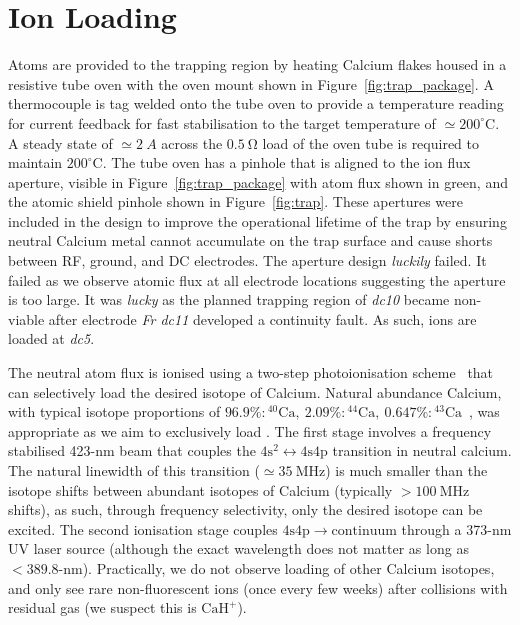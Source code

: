 \section{Ion Loading}
    Atoms are provided to the trapping region by heating Calcium flakes housed
    in a resistive tube oven with the oven mount shown in Figure~\ref{fig:trap_package}. A
    thermocouple is tag welded onto the tube oven to provide a temperature reading
    for current feedback for fast stabilisation to the target temperature of $\simeq
    200^\circ\mathrm{C}$. A steady state of $\simeq 2~\unit{A}$
    across the $0.5~\unit{\ohm}$ load of the oven tube is required to maintain $200^\circ\mathrm{C}$. The tube oven has a
    pinhole that is aligned to the ion flux aperture, visible in
    Figure~\ref{fig:trap_package} with atom flux shown in green, and the atomic shield pinhole shown in
    Figure~\ref{fig:trap}. These apertures were included in the design to
    improve the operational lifetime of the trap by ensuring neutral Calcium metal cannot
    accumulate on the trap surface and cause shorts between RF, ground, and DC
    electrodes. The aperture design \emph{luckily} failed. It failed as we
    observe atomic flux at all electrode locations suggesting the aperture is
    too large. It was \emph{lucky} as the planned trapping region of \emph{dc10} became
    non-viable after electrode \emph{Fr dc11} developed a continuity fault. As such, ions are loaded at \emph{dc5}.

    The neutral atom flux is ionised using a two-step photoionisation
    scheme~\cite{lucas_isotope-selective_2004} that can selectively load the desired isotope of Calcium.
    Natural abundance Calcium, with typical isotope proportions of
    $96.9\%:\mathrm{^{40}Ca},~2.09\%:\mathrm{^{44}Ca},~0.647\%:\mathrm{^{43}Ca}$~\cite{lucas_isotope-selective_2004}, was appropriate as we aim to exclusively load \ca.
    The first stage involves a frequency stabilised 423-nm beam
    that couples the $4\mathrm{s}^2\leftrightarrow 4\mathrm{s}4\mathrm{p}$ transition in neutral calcium. The natural linewidth of this transition ($\simeq 35~\unit{\mega\hertz}$) is much smaller than the isotope shifts between abundant isotopes of Calcium (typically $>100~\unit{\mega\hertz}$ shifts), as such, through frequency selectivity, only the desired isotope can be excited. 
    The second ionisation stage couples $4\mathrm{s}4\mathrm{p}\rightarrow \mathrm{continuum}$ through
    a 373-nm UV laser source (although the exact wavelength does not matter as
    long as $<389.8$-nm).
    Practically, we do not observe loading of other
    Calcium isotopes, and only see rare non-fluorescent ions (once every few
    weeks) after collisions with residual gas (we suspect this is
    $\mathrm{CaH}^+$). 

